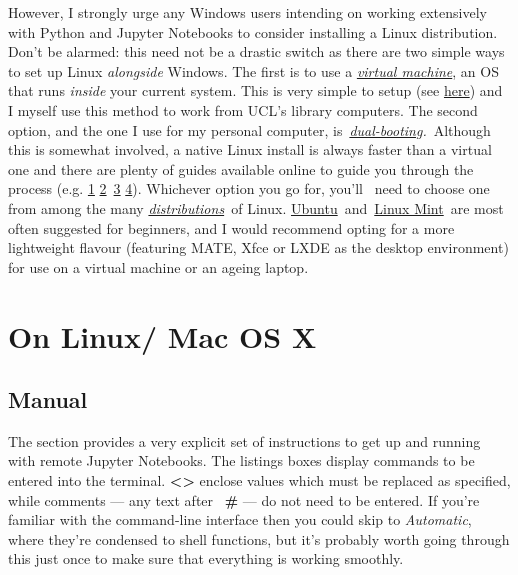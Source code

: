 \documentclass[a4paper]{article}
\begin{document}
However, I strongly urge any Windows users intending on working extensively with Python and Jupyter Notebooks to consider installing a Linux distribution.
Don't be alarmed: this need not be a drastic switch as there are two simple ways to set up Linux \emph{alongside} Windows.
The first is to use a \emph{\href{https://www.howtogeek.com/196060/beginner-geek-how-to-create-and-use-virtual-machines/}{virtual machine}}, an OS that runs \emph{inside} your current system.
This is very simple to setup (see \href{http://www.storagecraft.com/blog/the-dead-simple-guide-to-installing-a-linux-virtual-machine-on-windows/}{here}) and I myself use this method to work from UCL's library computers.
The second option, and the one I use for my personal computer, is~\emph{\href{https://www.howtogeek.com/187789/dual-booting-explained-how-you-can-have-multiple-operating-systems-on-your-computer/}{dual-booting}.}~Although this is somewhat involved, a native Linux install is always faster than a virtual one and there are plenty of guides available online to guide you through the process (e.g. \href{https://itsfoss.com/guide-install-linux-mint-16-dual-boot-windows/}{1} \href{https://www.lifewire.com/ultimate-windows-7-ubuntu-linux-dual-boot-guide-2200653}{2}~\href{https://www.howtogeek.com/214571/how-to-dual-boot-linux-on-your-pc/}{3} \href{http://www.pcworld.com/article/2955460/operating-systems/dual-booting-linux-with-windows-what-you-need-to-know.html}{4}). 
Whichever option you go for, you'll ~need to choose one from among the many \emph{\href{http://distrowatch.com/dwres.php?resource=major}{distributions}~}of Linux.
\href{https://www.ubuntu.com/download}{Ubuntu}~and~\href{https://linuxmint.com/}{Linux Mint}~are most often suggested for beginners, and I would recommend opting for a more lightweight flavour (featuring MATE, Xfce or LXDE as the desktop environment) for use on a virtual machine or an ageing laptop.

\section{On Linux/ Mac OS X}
\subsection{Manual}

The section provides a very explicit set of instructions to get up and running with remote Jupyter Notebooks.
The listings boxes display commands to be entered into the terminal. \textbf{\textless{}\textgreater{}} enclose values which must be replaced as specified, while comments --- any text after ~\textbf{\#} --- do not need to be entered.
If you're familiar with the command-line interface then you could skip to \emph{Automatic}, where they're condensed to shell functions, but it's probably worth going through this just once to make sure that everything is working smoothly.
\end{document}
